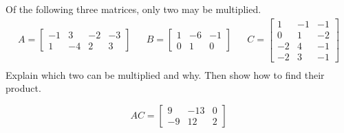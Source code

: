 
\begin{exerciseStatement}


Of the following three matrices, only two may be multiplied. 
\begin{align*} A= \left[\begin{array}{cccc}
-1 & 3 & -2 & -3 \\
1 & -4 & 2 & 3
\end{array}\right]  & & B= \left[\begin{array}{ccc}
1 & -6 & -1 \\
0 & 1 & 0
\end{array}\right]  & & C= \left[\begin{array}{ccc}
1 & -1 & -1 \\
0 & 1 & -2 \\
-2 & 4 & -1 \\
-2 & 3 & -1
\end{array}\right]  \\ \end{align*}
             Explain which two can be multiplied and why. Then show how to find their product.


\end{exerciseStatement}
    
\begin{exerciseAnswer} 
\[AC= \left[\begin{array}{ccc}
9 & -13 & 0 \\
-9 & 12 & 2
\end{array}\right] \]
\end{exerciseAnswer}
    
